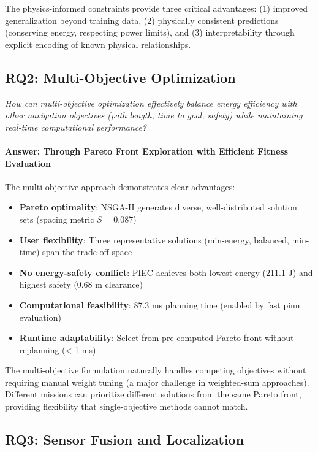 The physics-informed constraints provide three critical advantages: (1) improved generalization beyond training data, (2) physically consistent predictions (conserving energy, respecting power limits), and (3) interpretability through explicit encoding of known physical relationships.

\subsection{RQ2: Multi-Objective Optimization}

\textit{How can multi-objective optimization effectively balance energy efficiency with other navigation objectives (path length, time to goal, safety) while maintaining real-time computational performance?}

\paragraph{Answer: Through Pareto Front Exploration with Efficient Fitness Evaluation}
The multi-objective approach demonstrates clear advantages:

\begin{itemize}
    \item \textbf{Pareto optimality}: NSGA-II generates diverse, well-distributed solution sets (spacing metric $S = 0.087$)
    \item \textbf{User flexibility}: Three representative solutions (min-energy, balanced, min-time) span the trade-off space
    \item \textbf{No energy-safety conflict}: PIEC achieves both lowest energy (211.1 J) and highest safety (0.68 m clearance)
    \item \textbf{Computational feasibility}: 87.3 ms planning time (enabled by fast \acrshort{pinn} evaluation)
    \item \textbf{Runtime adaptability}: Select from pre-computed Pareto front without replanning (< 1 ms)
\end{itemize}

The multi-objective formulation naturally handles competing objectives without requiring manual weight tuning (a major challenge in weighted-sum approaches). Different missions can prioritize different solutions from the same Pareto front, providing flexibility that single-objective methods cannot match.

\subsection{RQ3: Sensor Fusion and Localization}

